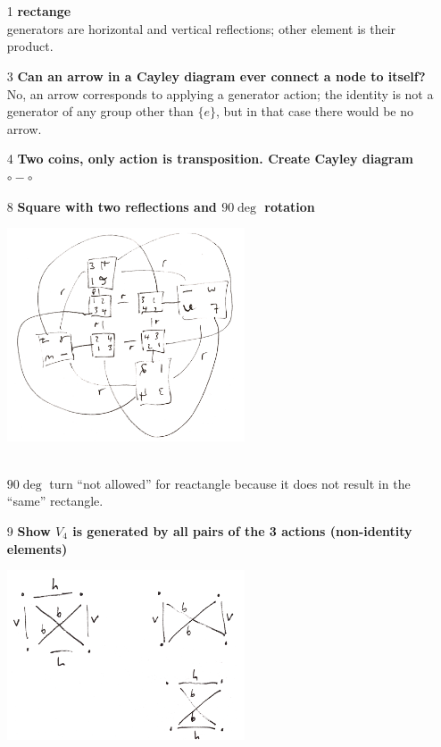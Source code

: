 \documentclass[12pt]{article}
\begin{document}
\section{}
\begin{enumerate}
\item[1] {\bf rectange}\\
  generators are horizontal and vertical reflections; other element is their product. \checkmark
\item[3] {\bf Can an arrow in a Cayley diagram ever connect a node to itself?}\\
  No, an arrow corresponds to applying a generator action; the identity is not a generator of any
  group other than $\{e\}$, but in that case there would be no arrow. \checkmark
\item[4] {\bf Two coins, only action is transposition. Create Cayley diagram}\\
  $\circ - \circ$ \checkmark
\item[8] {\bf Square with two reflections and $90\deg$ rotation}\\
  \begin{mdframed}
    \includegraphics[width=200pt]{img/visual-group-theory-2-8.png}
  \end{mdframed}
  \\
  $90\deg$ turn ``not allowed'' for reactangle because it does not result in the
  ``same'' rectangle. \checkmark
\item[9] {\bf Show $V_4$ is generated by all pairs of the 3 actions (non-identity elements)}\\
  \begin{mdframed}
    \includegraphics[width=200pt]{img/visual-group-theory-2-9.png}

\end{mdframed}
\end{enumerate}
\end{document}
